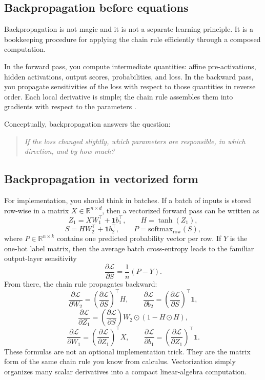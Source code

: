 \documentclass[11pt]{article}
\begin{document}
\subsection{Backpropagation before equations}

Backpropagation is not magic and it is not a separate learning principle. It is a bookkeeping procedure for applying the chain rule efficiently through a composed computation.

In the forward pass, you compute intermediate quantities: affine pre-activations, hidden activations, output scores, probabilities, and loss. In the backward pass, you propagate sensitivities of the loss with respect to those quantities in reverse order. Each local derivative is simple; the chain rule assembles them into gradients with respect to the parameters \cite{cs231n_backprop,ngdeep,goodfellow2016}.

Conceptually, backpropagation answers the question:
\begin{quote}
\textit{If the loss changed slightly, which parameters are responsible, in which direction, and by how much?}
\end{quote}

\subsection{Backpropagation in vectorized form}

For implementation, you should think in batches. If a batch of inputs is stored row-wise in a matrix $X \in \mathbb{R}^{n \times d}$, then a vectorized forward pass can be written as
\[
Z_1 = XW_1^\top + \mathbf{1}b_1^\top, \qquad H = \tanh(Z_1),
\]
\[
S = HW_2^\top + \mathbf{1}b_2^\top, \qquad P = \mathrm{softmax}_{\mathrm{row}}(S),
\]
where $P \in \mathbb{R}^{n \times k}$ contains one predicted probability vector per row. If $Y$ is the one-hot label matrix, then the average batch cross-entropy leads to the familiar output-layer sensitivity
\[
\frac{\partial \mathcal{L}}{\partial S} = \frac{1}{n}(P-Y).
\]
From there, the chain rule propagates backward:
\[
\frac{\partial \mathcal{L}}{\partial W_2} = \left(\frac{\partial \mathcal{L}}{\partial S}\right)^\top H, \qquad
\frac{\partial \mathcal{L}}{\partial b_2} = \left(\frac{\partial \mathcal{L}}{\partial S}\right)^\top \mathbf{1},
\]
\[
\frac{\partial \mathcal{L}}{\partial Z_1}
=
\left(\frac{\partial \mathcal{L}}{\partial S}\right) W_2 \odot (1-H \odot H),
\]
\[
\frac{\partial \mathcal{L}}{\partial W_1}
=
\left(\frac{\partial \mathcal{L}}{\partial Z_1}\right)^\top X, \qquad
\frac{\partial \mathcal{L}}{\partial b_1}
=
\left(\frac{\partial \mathcal{L}}{\partial Z_1}\right)^\top \mathbf{1}.
\]
These formulas are not an optional implementation trick. They are the matrix form of the same chain rule you know from calculus. Vectorization simply organizes many scalar derivatives into a compact linear-algebra computation.
\end{document}
